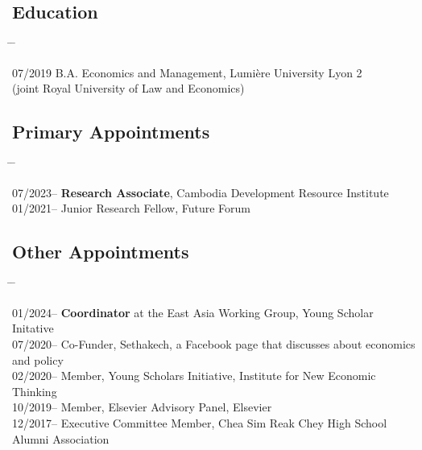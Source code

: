 \documentclass[10pt,a4paper]{article}
\newcommand{\tabbedblock}[1]{

	\begin{tabbing}
		\hspace{3cm} \= \hspace{4cm} \= \kill
		#1
	\end{tabbing}
}
\begin{document}
\subsection*{Education}

\tabbedblock{
	07/2019 \> B.A. Economics and Management, Lumière University Lyon 2\\
	\>(joint Royal University of Law and Economics)
}


\subsection*{Primary Appointments}	

\tabbedblock{
	07/2023--  \> \textbf{Research Associate}, Cambodia Development Resource Institute \\
	
	01/2021--  \> Junior Research Fellow, Future Forum \\
}

\vspace{-2em}	
\subsection*{Other Appointments}

\tabbedblock{
	
	
	01/2024-- \> \textbf{Coordinator} at the East Asia Working Group, Young Scholar Initative\\
	
	07/2020-- \> Co-Funder, Sethakech, a Facebook page that discusses about economics and policy\\
	
	02/2020-- \> Member, Young Scholars Initiative, Institute for New Economic Thinking\\
	
	10/2019-- \> Member, Elsevier Advisory Panel, Elsevier\\
	
	
	12/2017-- \> Executive Committee Member, Chea Sim Reak Chey High School Alumni Association
}
	
\end{document}
